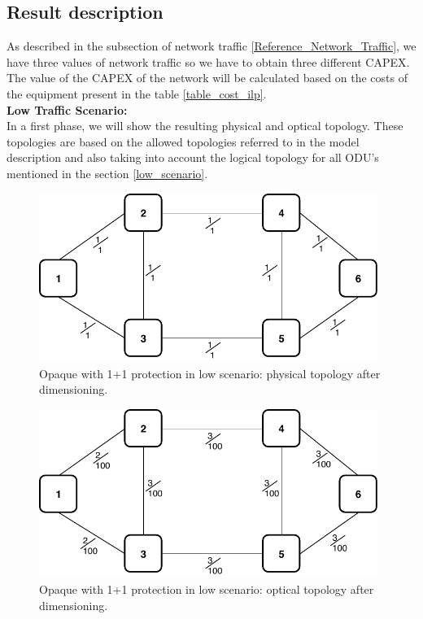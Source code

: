 \subsection{Result description}

As described in the subsection of network traffic \ref{Reference_Network_Traffic}, we have three values of network traffic so we have to obtain three different CAPEX.
The value of the CAPEX of the network will be calculated based on the costs of the equipment present in the table \ref{table_cost_ilp}.\\

\textbf{Low Traffic Scenario:}\\

In a first phase, we will show the resulting physical and optical topology. These topologies are based on the allowed topologies referred to in the model description and also taking into account the logical topology for all ODU's mentioned in the section \ref{low_scenario}.\\

\begin{figure}[h!]
\centering
\includegraphics[width=11cm]{sdf/ilp/opaque_protection/figures/physical_topology}
\caption{Opaque with 1+1 protection in low scenario: physical topology after dimensioning.}
\label{physical_protectionlow}
\end{figure}
\newpage
\begin{figure}[h!]
\centering
\includegraphics[width=11cm]{sdf/ilp/opaque_protection/figures/optical_topology_low}
\caption{Opaque with 1+1 protection in low scenario: optical topology after dimensioning.}
\label{optical_protectionlow}
\end{figure}

